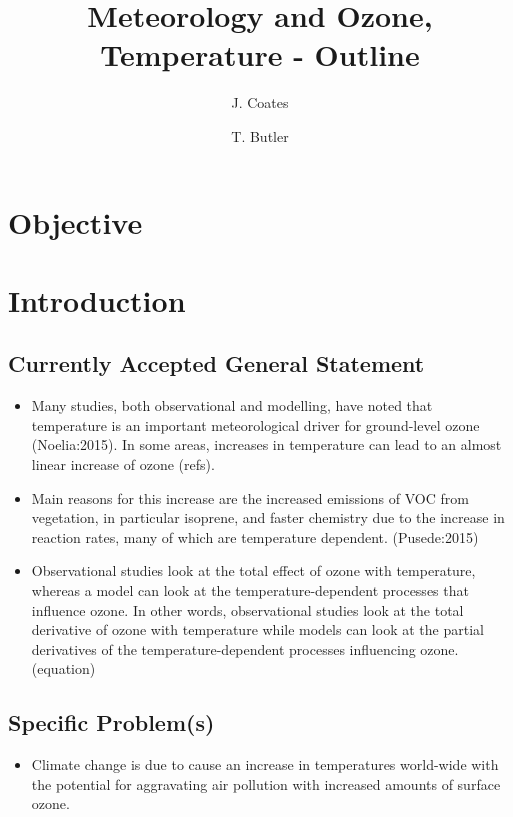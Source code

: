 \documentclass[11pt,a4paper]{article}
\title{Meteorology and Ozone, Temperature - Outline}
\author[1]{J. Coates}
\author[1]{T. Butler}
\affil[1]{Institute for Advanced Sustainability Studies, Potsdam, Germany}
\begin{document}
\maketitle

\section{Objective}


\section{Introduction} \label{s:introduction}
\subsection{Currently Accepted General Statement}
\begin{itemize}
    \item Many studies, both observational and modelling, have noted that temperature is an important meteorological driver for ground-level ozone (Noelia:2015). In some areas, increases in temperature can lead to an almost linear increase of ozone (refs).
    \item Main reasons for this increase are the increased emissions of VOC from vegetation, in particular isoprene, and faster chemistry due to the increase in reaction rates, many of which are temperature dependent. (Pusede:2015)
    \item Observational studies look at the total effect of ozone with temperature, whereas a model can look at the temperature-dependent processes that influence ozone. In other words, observational studies look at the total derivative of ozone with temperature while models can look at the partial derivatives of the temperature-dependent processes influencing ozone. (equation)
\end{itemize}

\subsection{Specific Problem(s)}
\begin{itemize}
    \item Climate change is due to cause an increase in temperatures world-wide with the potential for aggravating air pollution with increased amounts of surface ozone.
\end{itemize}
\end{document}
